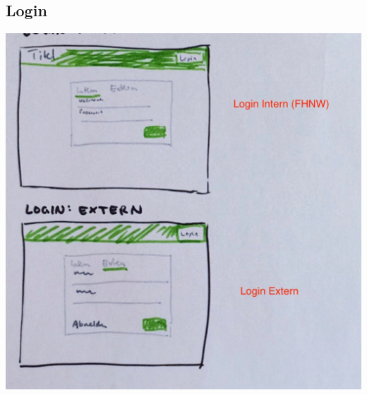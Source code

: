 \documentclass[11pt]{article} %
\begin{document}
\subsection{Login}
\includegraphics[width=1\textwidth]{prototyp/Login}
\end{document}
